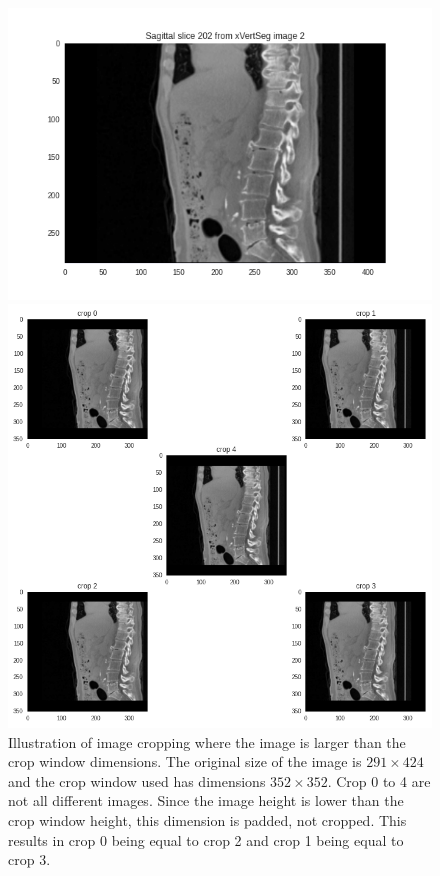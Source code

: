 \begin{figure}
    \centering
    \begin{minipage}{.99\textwidth}
        \includegraphics[width=.99\textwidth]{images/slice202.png}
    \end{minipage} 
    \begin{minipage}{0.99\textwidth}
        \includegraphics[width=.99\textwidth]{images/cropping_slice202.png}
    \end{minipage}
    \caption{
        Illustration of image cropping where the image is larger than the crop window dimensions.
        The original size of the image is $291 \times 424$ and the crop window used has dimensions $352 \times 352$.
        Crop 0 to 4 are not all different images. Since the image height is lower than the crop window height, this dimension is padded, not cropped.
        This results in crop 0 being equal to crop 2 and crop 1 being equal to crop 3. \label{fig:smallcrop}
        }
    
\end{figure}